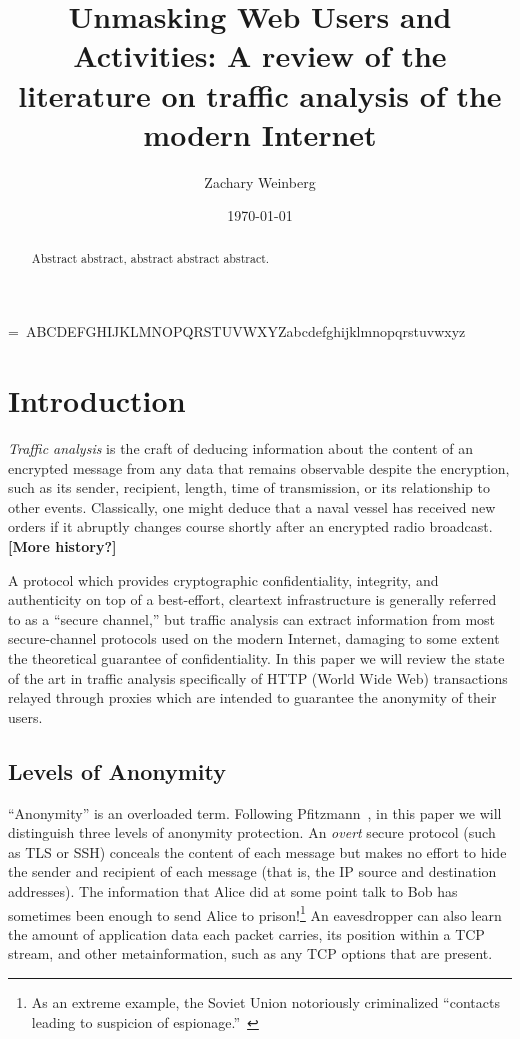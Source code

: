 \documentclass{zarticle}
\def\todo#1{{\color{todocolor}\bfseries [#1]}}
\begin{document}
=\hbox{\scriptsize%
ABCDEFGHIJKLMNOPQRSTUVWXYZabcdefghijklmnopqrstuvwxyz}
\edef\lht{\the\ht37}
\edef\ldp{\the\dp37}

\title{Unmasking Web Users and Activities:
  A review of the literature on traffic analysis of the modern Internet}
\author{Zachary Weinberg}
\date{\today}
\maketitle

\begin{abstract}
Abstract abstract, abstract abstract abstract.
\end{abstract}

\section{Introduction}

\emph{Traffic analysis} is the craft of deducing information about the
content of an encrypted message from any data that remains observable
despite the encryption, such as its sender, recipient, length, time of
transmission, or its relationship to other events.  Classically, one
might deduce that a naval vessel has received new orders if it
abruptly changes course shortly after an encrypted radio broadcast.
\todo{More history?}

A protocol which provides cryptographic confidentiality, integrity,
and authenticity on top of a best-effort, cleartext infrastructure is
generally referred to as a “secure channel,” but traffic analysis can
extract information from most secure-channel protocols used on the
modern Internet, damaging to some extent the theoretical guarantee of
confidentiality.  In this paper we will review the state of the art in
traffic analysis specifically of HTTP (World Wide Web) transactions
relayed through proxies which are intended to guarantee the anonymity
of their users.

\subsection{Levels of Anonymity}

“Anonymity” is an overloaded term.  Following
Pfitzmann~\cite{pfitzmann2010terminology}, in this paper we will
distinguish three levels of anonymity protection.  An \emph{overt}
secure protocol (such as TLS or SSH) conceals the content of each
message but makes no effort to hide the sender and recipient of each
message (that is, the IP source and destination addresses).  The
information that Alice did at some point talk to Bob has sometimes
been enough to send Alice to prison!\footnote{As an extreme example,
  the Soviet Union notoriously criminalized “contacts leading to
  suspicion of espionage.”~\cite{solzh1974gulag:svpsh}} An
eavesdropper can also learn the amount of application data each packet
carries, its position within a TCP stream, and other metainformation,
such as any TCP options that are present.
\end{document}
